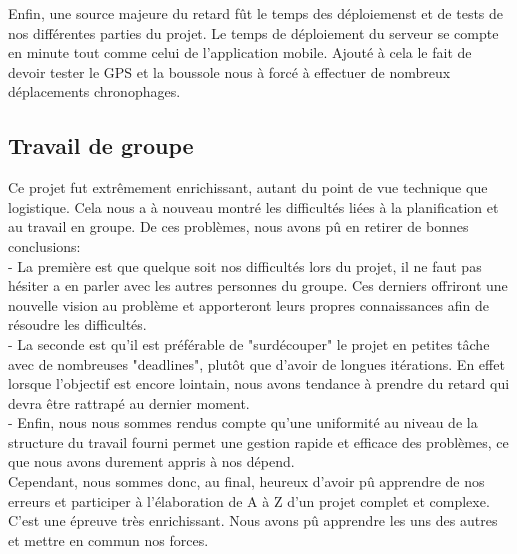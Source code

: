 \documentclass[french]{article}
\begin{document}
		Enfin, une source majeure du retard fût le temps des déploiemenst et de tests de nos différentes parties du projet. Le temps de déploiement du serveur se compte en minute tout comme celui de l'application mobile.
		Ajouté à cela le fait de devoir tester le GPS et la boussole nous à forcé à effectuer de nombreux déplacements chronophages.

		
		\subsection{Travail de groupe}
		Ce projet fut extrêmement enrichissant, autant du point de vue technique que logistique. Cela nous a à nouveau montré les difficultés liées à la planification et au travail en groupe. De ces problèmes, nous avons pû en retirer de bonnes conclusions: \\
		
		- La première est que quelque soit nos difficultés lors du projet, il ne faut pas hésiter a en parler avec les autres personnes du groupe. Ces derniers offriront une nouvelle vision au problème et apporteront leurs propres connaissances afin de résoudre les difficultés. \\
		
		- La seconde est qu'il est préférable de "surdécouper" le projet en petites tâche avec de nombreuses "deadlines", plutôt que d'avoir de longues itérations. En effet lorsque l'objectif est encore lointain,  nous avons tendance à prendre du retard qui devra être rattrapé au dernier moment. \\
		
		- Enfin, nous nous sommes rendus compte qu'une uniformité au niveau de la structure du travail fourni permet une gestion rapide et efficace des problèmes, ce que nous avons durement appris à nos dépend. \\ 
		
		
		Cependant, nous sommes donc, au final, heureux d'avoir pû apprendre de nos erreurs et participer à l'élaboration de A à Z d'un projet complet et complexe. C'est une épreuve très enrichissant. Nous avons pû apprendre les uns des autres et mettre en commun nos forces. 
		
		\newpage
	
	\newpage
	

			
	
	\listoffigures
			
\end{document}
